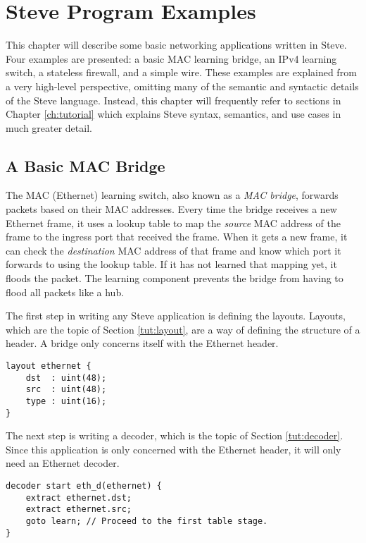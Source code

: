 \chapter{Steve Program Examples} \label{ch:examples}

This chapter will describe some basic networking applications written in Steve.
Four examples are presented: a basic MAC learning bridge, an IPv4 learning switch, a stateless firewall, and a simple wire. 
These examples are explained from a very high-level perspective, omitting many of the semantic and syntactic details of the Steve language.
Instead, this chapter will frequently refer to sections in Chapter \ref{ch:tutorial} which explains Steve syntax, semantics, and use cases in much greater detail.

\section{A Basic MAC Bridge} \label{tut:learning_switch}

The MAC (Ethernet) learning switch, also known as a \emph{MAC bridge}, forwards packets based on their MAC addresses.
Every time the bridge receives a new Ethernet frame, it uses a lookup table to map the \emph{source}
MAC address of the frame to the ingress port that received the frame.
When it gets a new frame, it can check the \emph{destination} MAC address of that frame
and know which port it forwards to using the lookup table.
If it has not learned that mapping yet, it floods the packet.
The learning component prevents the bridge from having to flood all packets like a hub.

The first step in writing any Steve application is defining the layouts.
Layouts, which are the topic of Section \ref{tut:layout}, are a way of defining the structure of a header.
A bridge only concerns itself with the Ethernet header.

\begin{lstlisting}
layout ethernet {
	dst  : uint(48);
	src  : uint(48);
	type : uint(16);
}
\end{lstlisting}

The next step is writing a decoder, which is the topic of Section \ref{tut:decoder}.
Since this application is only concerned with the
Ethernet header, it will only need an Ethernet decoder. 

\begin{lstlisting}
decoder start eth_d(ethernet) {
	extract ethernet.dst;
	extract ethernet.src;
	goto learn; // Proceed to the first table stage.
}
\end{lstlisting}

